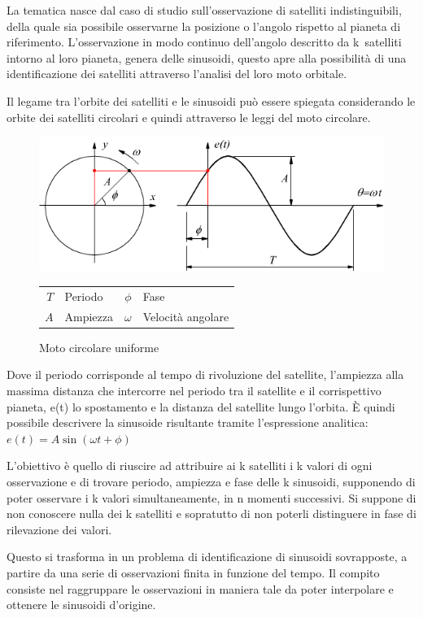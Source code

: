 \documentclass[a4paper,12pt]{report}
\begin{document}
La tematica nasce dal caso di studio sull'osservazione di satelliti indistinguibili, della quale sia possibile osservarne la posizione o l'angolo rispetto al pianeta di riferimento.
L'osservazione in modo continuo dell'angolo descritto da  k~satelliti intorno al loro pianeta, genera delle sinusoidi, questo apre alla possibilità di una identificazione dei satelliti attraverso l'analisi del loro moto orbitale.

Il legame tra l'orbite dei satelliti e le sinusoidi può essere spiegata considerando le orbite dei satelliti circolari e quindi attraverso le leggi del moto circolare.
\begin{figure}[H]
  \caption{Moto circolare uniforme}
  \begin{center}
  \includegraphics[scale=0.50]{img/sinusoide_cerchio.png}
  \begin{tabular}{r@{: }l r@{: }l}
  $T$ & Periodo & $\phi$ & Fase \\
  $A$ & Ampiezza & $\omega$ & Velocità angolare
  \end{tabular}
  \end{center}
\end{figure}


Dove il periodo corrisponde al tempo di rivoluzione del satellite, l'ampiezza alla massima distanza che intercorre nel periodo tra il satellite e il corrispettivo pianeta, e(t) lo spostamento e la distanza del satellite lungo l'orbita.
È quindi possibile descrivere la sinusoide risultante tramite l'espressione analitica:
$ e(t) = A\sin(\omega t + \phi)$



L'obiettivo è quello di riuscire ad attribuire ai k satelliti i k valori di
ogni osservazione e di trovare periodo, ampiezza e fase delle k sinusoidi,
supponendo di poter osservare i k valori simultaneamente, in n momenti
successivi. Si suppone di non conoscere nulla dei k satelliti e sopratutto di non poterli distinguere in fase di rilevazione dei valori.

Questo si trasforma in un problema di identificazione di sinusoidi sovrapposte, a partire da una serie di osservazioni finita in funzione del tempo. Il compito consiste nel raggruppare le osservazioni in maniera tale da poter interpolare e ottenere le sinusoidi d'origine.
\end{document}
